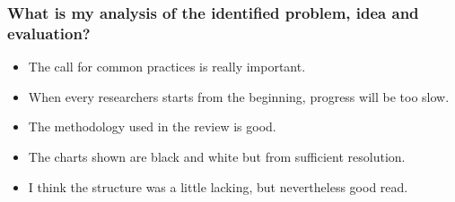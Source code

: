     \subsubsection*{What is my analysis of the identified problem, idea and evaluation?}
    \begin{itemize}
        \item The call for common practices is really important. 
        \item When every researchers starts from the beginning, progress will be too slow.
        \item The methodology used in the review is good.
        \item The charts shown are black and white but from sufficient resolution. 
        \item I think the structure was a little lacking, but nevertheless good read.
    \end{itemize}
